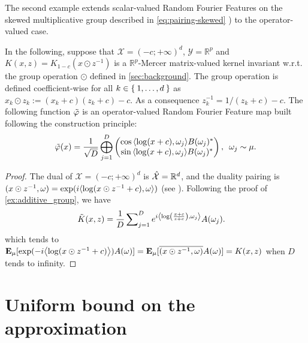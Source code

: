 The second example extends scalar-valued Random Fourier Features on the skewed multiplicative group described in \cref{eq:pairing-skewed} \cite{li2010random}) to the operator-valued case.
\begin{example}
In the following, suppose that $\mathcal{X}=(-c;+\infty)^d$, $\mathcal{Y}=\mathbb{R}^p$ and $K(x,z)=K_{1-c}(x\odot z^{-1})$ is a $\mathbb{R}^p$-Mercer matrix-valued kernel invariant w.r.t. the group operation $\odot$ defined in \cref{sec:background}. The group operation is defined coefficient-wise for all $k\inrange{1}{d}$ as $x_k\odot z_k := (x_k + c)(z_k + c)-c$. As a consequence $z^{-1}_k=1/(z_k+c)-c$.
The following function $\tildePhi$ is an operator-valued Random Fourier Feature map built following the construction principle:
\begin{equation*}
\begin{aligned}
\tildePhi(x)=\frac{1}{\sqrt{D}}\Vect_{j=1}^D\begin{pmatrix}\cos{\inner{\log(x+c),\omega_j}}B(\omega_j)^* \\ \sin{\inner{\log(x+c),\omega_j}}B(\omega_j)^*\end{pmatrix}, \enskip \omega_j \sim \mu.
\end{aligned}
\end{equation*}
\end{example}
\begin{proof}
The dual of $\mathcal{X}=(-c;+\infty)^d$
is $\dual{\mathcal{X}}=\mathbb{R}^d$, and the duality pairing is $\pairing{x \odot \myinv{z},\omega}=\exp(i\inner{\log(x\odot z^{-1}+c), \omega})$ (see \citet{Li2010}). Following the proof of \cref{ex:additive_group}, we have
\begin{equation*}
\begin{aligned}
\tilde{K}(x,z)&= \frac{1}{D} \sum\nolimits_{j=1}^D e^{i\inner*{\log\left(\frac{x+c}{z+c}\right), \omega_j}}A(\omega_j).
\end{aligned}
\end{equation*}
which tends to $\expectation_{\mu}[\exp(-i\inner*{\log(x\odot z^{-1}+c)})A(\omega) ]=\expectation_{\mu}[\conj{\pairing{x\odot z^{-1},\omega}}A(\omega)]=K(x, z)$ when $D$ tends to infinity.
\end{proof}

\section{Uniform bound on the approximation}
\label{sec:uniform_bound_on_the_approximation}

